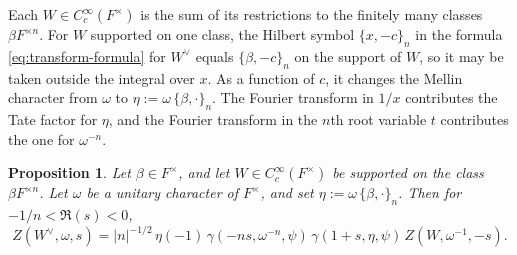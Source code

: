 \documentclass[reqno]{amsart}
\theoremstyle{plain}
\newtheorem{proposition}[theorem]{Proposition}
\theoremstyle{definition}
\theoremstyle{itplain}
\numberwithin{equation}{section}
\numberwithin{theorem}{section}
\begin{document}
Each $W \in C_c^\infty(F^\times)$ is the sum of its restrictions to the finitely many classes $\beta F^{\times n}$.  For $W$ supported on one class, the Hilbert symbol $\{x, -c\}_n$ in the formula \eqref{eq:transform-formula} for $W^\vee$ equals $\{\beta, -c\}_n$ on the support of $W$, so it may be taken outside the integral over $x$.  As a function of $c$, it changes the Mellin character from $\omega$ to $\eta := \omega \, \{\beta, \cdot\}_n$.  The Fourier transform in $1/x$ contributes the Tate factor for $\eta$, and the Fourier transform in the $n$th root variable $t$ contributes the one for $\omega^{-n}$.
\begin{proposition}\label{proposition:mellin}
  Let $\beta \in F^\times$, and let $W \in C_c^\infty(F^\times)$ be supported on the class $\beta F^{\times n}$.  Let $\omega$ be a unitary character of $F^\times$, and set $\eta := \omega \, \{\beta, \cdot\}_n$.  Then for $-1/n < \Re(s) < 0$,
  \begin{equation*}
    Z(W^\vee, \omega, s) = \lvert n \rvert^{-1/2} \, \eta(-1) \, \gamma(- n s, \omega^{-n}, \psi) \, \gamma(1 + s, \eta, \psi) \, Z(W, \omega^{-1}, -s).
  \end{equation*}
\end{proposition}
\end{document}
